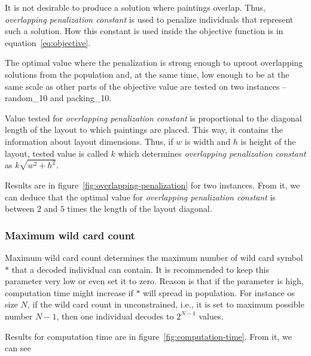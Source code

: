 It is not desirable to produce a solution where paintings overlap.
Thus, \textit{overlapping penalization constant} is used to penalize
individuals that represent such a solution.
How this constant is used inside the objective function is in equation~\ref{eq:objective}.

The optimal value where the penalization is strong enough
to uproot overlapping solutions from the population and, at the same time, low enough
to be at the same scale as other parts of the objective value are tested on two instances – random\_10 and packing\_10.

Value tested for \textit{overlapping penalization constant} is proportional to the diagonal length of the layout to which paintings are placed.
This way, it contains the information about layout dimensions.
Thus, if $w$ is width and $h$ is height of the layout, tested value is called $k$ which determines
\textit{overlapping penalization constant} as $k\sqrt{w^2 + h^2}$.

Results are in figure~\ref{fig:overlapping-penalization} for two instances.
From it, we can deduce that the optimal value for \textit{overlapping penalization constant} is between $2$ and $5$ times the length of the layout diagonal.

\subsubsection*{Maximum wild card count}
Maximum wild card count determines the maximum number of wild card symbol $*$ that a decoded individual can contain.
It is recommended to keep this parameter very low or even set it to zero.
Reason is that if the parameter is high, computation time might increase if $*$ will spread in population.
For instance os size $N$, if the wild card count in unconstrained, i.e., it is set to maximum possible number $N-1$,
then one individual decodes to $2^{N-1}$ values.

Results for computation time are in figure~\ref{fig:computation-time}.
From it, we can see



